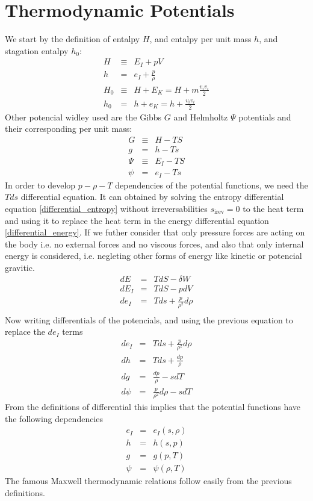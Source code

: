 \section{Thermodynamic Potentials}
We start by the definition of entalpy $H$, and entalpy per unit mass $h$, and stagation entalpy $h_0$: 
\begin{eqnarray}
   H &\equiv& E_I + pV \\  
   h & = & e_I + \frac{p}{\rho}\\
   H_0 &\equiv& H + E_K = H + m\frac{v_i v_i}{2}\\
   h_0 &=& h + e_K = h + \frac{v_i v_i}{2}
\end{eqnarray}
Other potencial widley used are the Gibbs $G$ and Helmholtz $\Psi$ potentials and their corresponding per unit mass:
\begin{eqnarray}
   G &\equiv& H - TS \\  
   g &=& h - Ts \\  
   \Psi &\equiv& E_I- TS \\  
   \psi &=& e_I- Ts 
\end{eqnarray}
In order to develop $p-\rho-T$ dependencies of the potential functions, we need the $Tds$ differential equation. It can obtained by solving the entropy differential equation \eqref{differential_entropy} without irreversabilities $s_{\text{irev}}=0$ to the heat term and using it to replace the heat term in the energy differential equation \eqref{differential_energy}. If we futher consider that only pressure forces are acting on the body i.e. no external forces and no viscous forces, and also that only internal energy is considered, i.e. negleting other forms of energy like kinetic or potencial gravitic. 
\begin{eqnarray}
    dE &=& TdS - \delta W \\  
    dE_I &=& TdS - pdV\\  
    de_I &=& Tds + \frac{p}{\rho^2}d\rho \\
\end{eqnarray}
Now writing differentials of the potencials, and using the previous equation to replace the $de_I$ terms
\begin{eqnarray}
   de_I &=& Tds + \frac{p}{\rho^2}d\rho \\
   dh & = & Tds + \frac{dp}{\rho}\\
   dg &=& \frac{dp}{\rho} - sdT \\  
   d\psi &=& \frac{p}{\rho^2}d\rho - sdT 
\end{eqnarray}
From the definitions of differential this implies that the potential functions have the following dependencies
\begin{eqnarray}
   e_I  & = &   e_I(s,\rho)  \\
   h    & = &   h(s,p)       \\
   g    & = &   g(p,T)       \\
   \psi & = &   \psi(\rho,T)
\end{eqnarray}
The famous Maxwell thermodynamic relations follow easily from the previous definitions.


